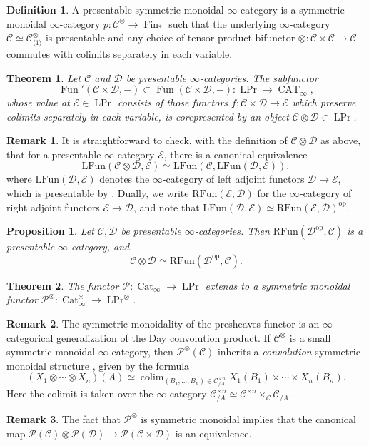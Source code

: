 \documentclass[12pt]{article}
\newtheorem{theorem}{Theorem}[subsection]
\newtheorem{proposition}{Proposition}[subsection]
\theoremstyle{definition}
\newtheorem{definition}{Definition}[subsection]
\newtheorem{remark}{Remark}[subsection]
\newcommand{\C}{\mathcal{C}}
\newcommand{\D}{\mathcal{D}}
\newcommand{\E}{\mathcal{E}}
\renewcommand{\P}{\mathcal{P}}
\renewcommand{\i}{\infty}
\newcommand{\too}{\longrightarrow}
\newcommand{\op}{\mathrm{op}}
\DeclareMathOperator{\Cat}{Cat}
\DeclareMathOperator{\CAT}{CAT}
\DeclareMathOperator{\Fin}{Fin}
\DeclareMathOperator{\Fun}{Fun}
\newcommand{\Funl}{\mathrm{LFun}}
\newcommand{\Funr}{\mathrm{RFun}}
\DeclareMathOperator{\colim}{colim}
\DeclareMathOperator{\PrL}{LPr}
\DeclareMathOperator{\Prl}{LPr}
\begin{document}
\begin{definition}
A presentable symmetric monoidal $\infty$-category is a symmetric monoidal $\infty$-category $p:\C^\otimes\to\Fin_*$
such that the underlying $\infty$-category $\C\simeq\C^\otimes_{\langle 1\rangle}$ is presentable and any choice of tensor product bifunctor $\otimes:\C\times\C\to\C$ commutes with colimits separately in each variable.
\end{definition}
\begin{theorem}{\em \cite[Proposition 4.8.1.17]{HA}}
Let $\C$ and $\D$ be presentable $\infty$-categories.
The subfunctor
\[
\Fun'(\C\times\D,-)\subset\Fun(\C\times\D,-)\colon\Prl\too\CAT_\i,
\]
whose value at $\E\in\Prl$ consists of those functors $f:\C\times\D\to\E$ which preserve colimits separately in each variable, is corepresented by an object $\C\otimes\D\in\Prl$.
\end{theorem}
\begin{remark}
It is straightforward to check, with the definition of $\C\otimes\D$ as above, that for a presentable $\infty$-category $\E$, there is a canonical equivalence
\[
\Funl(\C\otimes\D,\E)\simeq\Funl(\C,\Funl(\D,\E)),
\]
where $\Funl(\D,\E)$
\index{$\Funl$}
denotes the $\infty$-category of left adjoint functors $\D\to\E$, which is presentable by \cite{HA}.
Dually, we write $\Funr(\E,\D)$
\index{$\Funr$}
for the $\infty$-category of right adjoint functors $\E\to\D$, and note that $\Funl(\D,\E)\simeq\Funr(\E,\D)^{\op}$.
\end{remark}
\begin{proposition}{\em \cite[Lemma 4.8.1.16]{HA}}
Let $\C,\D$ be presentable $\infty$-categories. Then $\Funr(\D^{\op},\C)$ is a presentable $\i$-category, and 
\[
\C\otimes\D\simeq\Funr(\D^{\op},\C).
\]
\end{proposition}


\begin{theorem}{\em \cite[Corollary 4.8.1.12]{HA}}
The functor $\P\colon\Cat_\i\to\PrL$ extends to a symmetric monoidal functor $\P^\otimes:\Cat_\i^{\times}\to\PrL^\otimes$.
\end{theorem}
\begin{remark}
The symmetric monoidality of the presheaves functor is an $\infty$-categorical generalization of the Day convolution product.
If $\C^\otimes$ is a small symmetric monoidal $\infty$-category, then $\P^\otimes(\C)$ inherits a {\em convolution} symmetric monoidal structure \cite[Remark 4.8.1.13]{HA}, given by the formula
\[
(X_1\otimes\cdots\otimes X_n)(A)\simeq\colim_{(B_1,\ldots,B_n)\in\C^{\times n}_{/A}} X_1(B_1)\times\cdots\times X_n(B_n).
\]
Here the colimit is taken over the $\infty$-category $\C^{\times n}_{/A}\simeq\C^{\times n}\times_\C \C_{/A}$.
\end{remark}
\begin{remark}
The fact that $\P^\otimes$ is symmetric monoidal implies that the canonical map $\P(\C)\otimes\P(\D)\to\P(\C\times\D)$ is an equivalence.
\end{remark}
\end{document}
